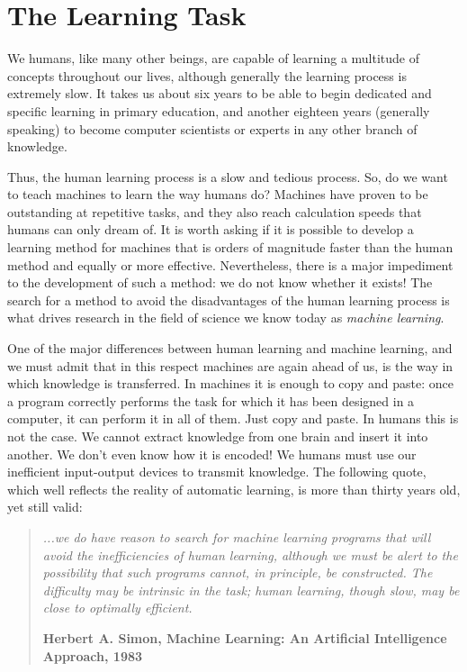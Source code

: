 \section{The Learning Task}

We humans, like many other beings, are capable of learning a multitude of concepts throughout our lives, although generally the learning process is extremely slow. It takes us about six years to be able to begin dedicated and specific learning in primary education, and another eighteen years (generally speaking) to become computer scientists or experts in any other branch of knowledge.

Thus, the human learning process is a slow and tedious process. So, do we want to teach machines to learn the way humans do? Machines have proven to be outstanding at repetitive tasks, and they also reach calculation speeds that humans can only dream of. It is worth asking if it is possible to develop a learning method for machines that is orders of magnitude faster than the human method and equally or more effective. Nevertheless, there is a major impediment to the development of such a method: we do not know whether it exists! The search for a method to avoid the disadvantages of the human learning process is what drives research in the field of science we know today as \textit{machine learning}. 

One of the major differences between human learning and machine learning, and we must admit that in this respect machines are again ahead of us, is the way in which knowledge is transferred. In machines it is enough to copy and paste: once a program correctly performs the task for which it has been designed in a computer, it can perform it in all of them. Just copy and paste. In humans this is not the case. We cannot extract knowledge from one brain and insert it into another. We don't even know how it is encoded! We humans must use our inefficient input-output devices to transmit knowledge. The following quote, which well reflects the reality of automatic learning, is more than thirty years old, yet still valid:

\begin{quotation}{\slshape
		...we do have reason to search for machine learning programs that will avoid the inefficiencies of human learning, although we must be alert to the possibility that such programs cannot, in principle, be constructed. The difficulty may be intrinsic in the task; human learning, though slow, may be close to optimally efficient.}
	\begin{flushright}
		\textbf{Herbert A. Simon, Machine Learning: An Artificial Intelligence Approach, 1983} 
	\end{flushright}
\end{quotation}

